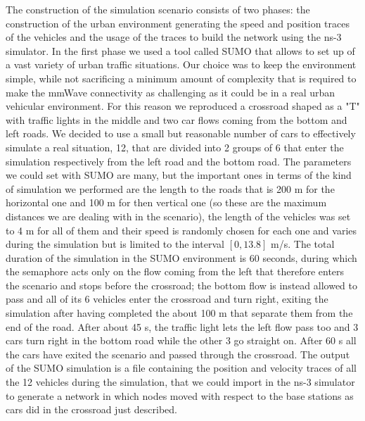 \documentclass[conference,10pt]{IEEEtran}
\begin{document}
The construction of the simulation scenario consists of two phases: the construction of the urban environment generating the speed and position traces of the vehicles and the usage of the traces to build the network using the ns-3 simulator. In the first phase we used a tool called SUMO \cite{} that allows to set up of a vast variety of urban traffic situations. 
Our choice was to keep the environment simple, while not sacrificing a minimum amount of complexity that is required to make the mmWave connectivity as challenging as it could be in a real urban vehicular environment. For this reason we reproduced a crossroad shaped as a "T" with traffic lights in the middle and two car flows coming from the bottom and left roads. We decided to use a small but reasonable number of cars to effectively simulate a real situation, 12, that are divided into 2 groups of 6 that enter the simulation respectively from the left road and the bottom road. The parameters we could set with SUMO are many, but the important ones in terms of the kind of simulation we performed are the length to the roads that is 200 m for the horizontal one and 100 m for then vertical one (so these are the maximum distances we are dealing with in the scenario), the length of the vehicles was set to 4 m for all of them and their speed is randomly chosen for each one and varies during the simulation but is limited to the interval $[0, 13.8]$ m/s.
The total duration of the simulation in the SUMO environment is 60 seconds, during which the semaphore acts only on the flow coming from the left that therefore enters the scenario and stops before the crossroad; the bottom flow is instead allowed to pass and all of its 6 vehicles enter the crossroad and turn right, exiting the simulation after having completed the about 100 m that separate them from the end of the road. After about 45 s, the traffic light lets the left flow pass too and 3 cars turn right in the bottom road while the other 3 go straight on. After 60 s all the cars have exited the scenario and passed through the crossroad. The output of the SUMO simulation is a file containing the position and velocity traces of all the 12 vehicles during the simulation, that we could import in the ns-3 simulator to generate a network in which nodes moved with respect to the base stations as cars did in the crossroad just described. 
\end{document}
